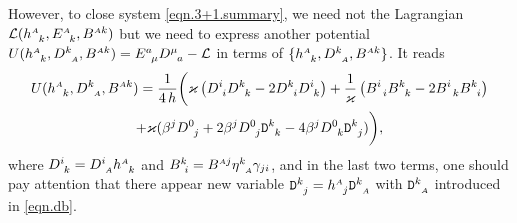 \documentclass[
10pt, %
a4paper, %
oneside, %
headinclude,footinclude, %
BCOR5mm, %
]{scrartcl}
\newcommand{\sA}{\mathsmaller A}
\newcommand{\tetrsymbol}{h}
\newcommand{\itetrsymbol}{\eta}
\newcommand{\itetr}[2]{\itetrsymbol^{#1}_{\phantom{#1}#2}}
\newcommand{\tetr}[2]{\tetrsymbol^{#1}_{\phantom{#1}#2}}
\newcommand{\ET}[2]{E^{#1}_{\phantom{#1}#2}}	%
\newcommand{\Dm}[2]{D_{\phantom{#2}#1}^{#2}}	%
\newcommand{\Dfin}[2]{\mathtt{D}_{\phantom{#2}#1}^{#2}}	%
\newcommand{\BT}[2]{B^{#1#2}}	%
\newcommand{\Bmmix}[2]{B^{#1}_{#2}}	%
\newcommand{\Bm}[2]{B^{#1#2}}	%
\newcommand{\LagBE}{\mathcal{L}}%
\newcommand{\Um}{U}%
\begin{document}
However, to close system \eqref{eqn.3+1.summary}, we need not the Lagrangian $ 
\LagBE(\tetr{\sA}{k},\ET{\sA}{k},\BT{\sA}{k}) $ but we need to express another 
potential $ \Um(\tetr{\sA}{k},\Dm{\sA}{k},\Bm{\sA}{k}) = \ET{a}{\mu} 
\Dm{a}{\mu} - \LagBE$
in terms of $ \{\tetr{\sA}{k},\Dm{\sA}{k},\Bm{\sA}{k}\} $. It reads
\begin{multline}\label{eqn.Lagr.DB}
	\Um(\tetr{\sA}{k},\Dm{\sA}{k},\Bm{\sA}{k}) = 
	\frac{1}{4\,h} \bigg( \varkappa \left(
	\Dm{i}{i}\Dm{k}{k} - 2 \Dm{i}{k}\Dm{k}{i}
	\right)
	+ \frac{1}{\varkappa} \left ( 
	\Bmmix{i}{\ \,i}\Bmmix{k}{\ \,k}
	- 2 \Bmmix{i}{\ \,k}\Bmmix{k}{\ \,i}
	\right ) \\
	+ \varkappa (\beta^j \Dm{j}{0} + 2 \beta^j \Dm{j}{0}\Dfin{k}{k} - 4 \beta^j \Dm{k}{0} 
	\Dfin{j}{k}) 
	\bigg),
\end{multline}
where $ \Dm{k}{i} = \Dm{\sA}{i} \tetr{\sA}{k} $ and $ \Bmmix{k}{\ i} = \Bm{\sA}{j} \itetr{k}{\sA} 
\gamma_{ji} $, and in the last two terms, one should pay attention that there appear new variable 
$ \Dfin{j}{k} = \tetr{\sA}{j} \Dfin{\sA}{k}$ with $ \Dfin{\sA}{k} $ introduced in \eqref{eqn.db}.
\end{document}
